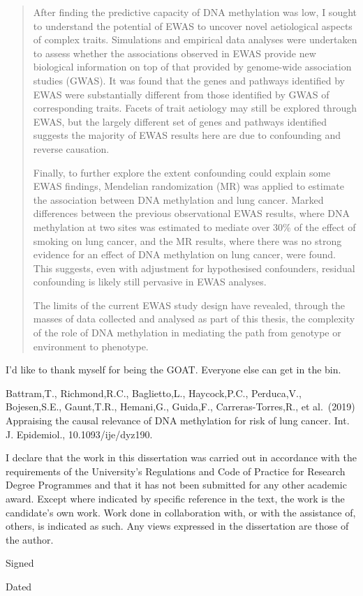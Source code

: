 \documentclass[11pt,oneside]{bristolthesis}
\begin{document}
\begin{abstract}
    After finding the predictive capacity of DNA methylation was low, I sought to understand the potential of EWAS to uncover novel aetiological aspects of complex traits. Simulations and empirical data analyses were undertaken to assess whether the associations observed in EWAS provide new biological information on top of that provided by genome-wide association studies (GWAS). It was found that the genes and pathways identified by EWAS were substantially different from those identified by GWAS of corresponding traits. Facets of trait aetiology may still be explored through EWAS, but the largely different set of genes and pathways identified suggests the majority of EWAS results here are due to confounding and reverse causation.

    Finally, to further explore the extent confounding could explain some EWAS findings, Mendelian randomization (MR) was applied to estimate the association between DNA methylation and lung cancer. Marked differences between the previous observational EWAS results, where DNA methylation at two sites was estimated to mediate over 30\% of the effect of smoking on lung cancer, and the MR results, where there was no strong evidence for an effect of DNA methylation on lung cancer, were found. This suggests, even with adjustment for hypothesised confounders, residual confounding is likely still pervasive in EWAS analyses.

    The limits of the current EWAS study design have revealed, through the masses of data collected and analysed as part of this thesis, the complexity of the role of DNA methylation in mediating the path from genotype or environment to phenotype.
  \end{abstract}
  \begin{acknowledgements}
    I'd like to thank myself for being the GOAT. Everyone else can get in the bin.
  \end{acknowledgements}
  \begin{publications}
    Battram,T., Richmond,R.C., Baglietto,L., Haycock,P.C., Perduca,V., Bojesen,S.E., Gaunt,T.R., Hemani,G., Guida,F., Carreras-Torres,R., et al.~(2019) Appraising the causal relevance of DNA methylation for risk of lung cancer. Int. J. Epidemiol., 10.1093/ije/dyz190.
  \end{publications}
  \begin{declaration}
    I declare that the work in this dissertation was carried out in accordance with the requirements of the University's Regulations and Code of Practice for Research Degree Programmes and that it has not been submitted for any other academic award. Except where indicated by specific reference in the text, the work is the candidate's own work. Work done in collaboration with, or with the assistance of, others, is indicated as such. Any views expressed in the dissertation are those of the author.

    \bigskip
    \bigskip
    \bigskip
    \bigskip
    \bigskip

    Signed

    \bigskip
    \bigskip
    \bigskip
    \bigskip
    \bigskip

    Dated
  \end{declaration}
\end{document}
